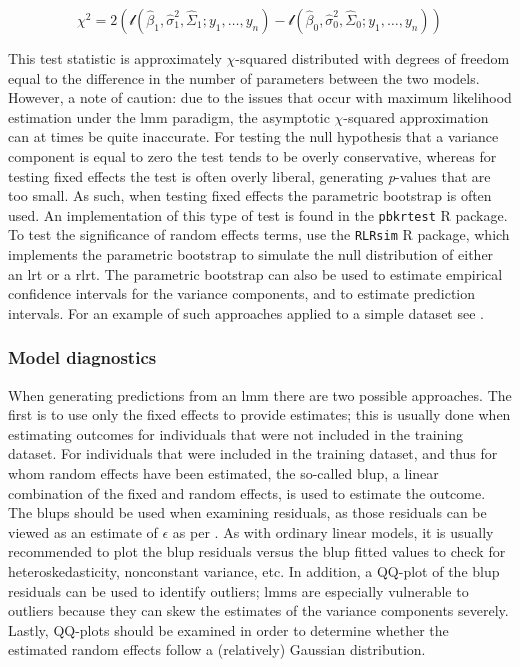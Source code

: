 \documentclass{report}
\begin{document}
\begin{equation}\label{eq:glm-glmm-lrt-statistic}
    \chi^2 = 2 \left(\mathcal{l}\left(\hat{\beta}_1, \hat{\sigma}^2_1, \hat{\Sigma}_1; y_1, \dots, y_n\right) - \mathcal{l}\left(\hat{\beta}_0, \hat{\sigma}^2_0, \hat{\Sigma}_0; y_1, \dots, y_n\right)\right)
\end{equation}

This test statistic is approximately $\chi$-squared distributed with degrees of freedom equal to the difference in the number of parameters between the two models. However, a note of caution: due to the issues that occur with maximum likelihood estimation under the \gls{lmm} paradigm, the asymptotic $\chi$-squared approximation can at times be quite inaccurate. For testing the null hypothesis that a variance component is equal to zero the test tends to be overly conservative, whereas for testing fixed effects the test is often overly liberal, generating \textit{p}-values that are too small. As such, when testing fixed effects the parametric bootstrap is often used. An implementation of this type of test is found in the \texttt{pbkrtest} R package. To test the significance of random effects terms, use the \texttt{RLRsim} R package, which implements the parametric bootstrap to simulate the null distribution of either an \gls{lrt} or a \gls{rlrt}. The parametric bootstrap can also be used to estimate empirical confidence intervals for the variance components, and to estimate prediction intervals. For an example of such approaches applied to a simple dataset see \cite[Chapter~10.2]{faraway_extending_2016}. 

\subsubsection{Model diagnostics}

When generating predictions from an \gls{lmm} there are two possible approaches. The first is to use only the fixed effects to provide estimates; this is usually done when estimating outcomes for individuals that were not included in the training dataset. For individuals that were included in the training dataset, and thus for whom random effects have been estimated, the so-called \gls{blup}, a linear combination of the fixed and random effects, is used to estimate the outcome. The \glspl{blup} should be used when examining residuals, as those residuals can be viewed as an estimate of $\epsilon$ as per \cite[Chapter~10.5]{faraway_extending_2016}. As with ordinary linear models, it is usually recommended to plot the \gls{blup} residuals versus the \gls{blup} fitted values to check for heteroskedasticity, nonconstant variance, etc. In addition, a QQ-plot of the \gls{blup} residuals can be used to identify outliers; \glspl{lmm} are especially vulnerable to outliers because they can skew the estimates of the variance components severely. Lastly, QQ-plots should be examined in order to determine whether the estimated random effects follow a (relatively) Gaussian distribution. 
\end{document}
